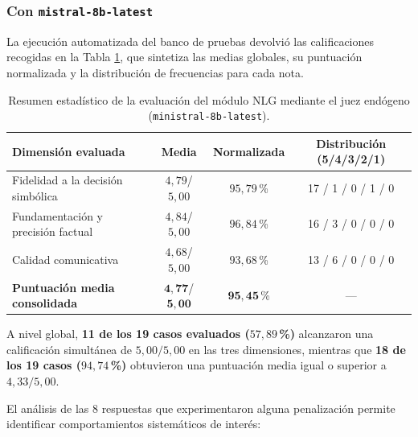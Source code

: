 \documentclass[12pt,a4paper]{report}
\begin{document}
\subsubsection{Con \texttt{mistral-8b-latest}}
La ejecución automatizada del banco de pruebas devolvió las calificaciones recogidas en la Tabla \ref{tab:nlg_summary}, que sintetiza las medias globales, su puntuación normalizada y la distribución de frecuencias para cada nota.

\begin{table}[H]
\centering
\footnotesize
\setlength{\tabcolsep}{4pt}
\label{tab:nlg_summary}
\begin{tabularx}{\textwidth}{@{}>{\raggedright\arraybackslash}X c c c@{}}
\toprule
\textbf{Dimensión evaluada} & \textbf{Media} & \textbf{Normalizada} & \textbf{Distribución (5/4/3/2/1)} \\
\midrule
Fidelidad a la decisión simbólica & $4{,}79$/$5{,}00$ & $95{,}79\,$\% & 17 / 1 / 0 / 1 / 0 \\
Fundamentación y precisión factual & $4{,}84$/$5{,}00$ & $96{,}84\,$\% & 16 / 3 / 0 / 0 / 0 \\
Calidad comunicativa & $4{,}68$/$5{,}00$ & $93{,}68\,$\% & 13 / 6 / 0 / 0 / 0 \\
\midrule
\textbf{Puntuación media consolidada} & $\mathbf{4{,}77}$/$\mathbf{5{,}00}$ & $\mathbf{95{,}45\,}$\% & --- \\
\end{tabularx}
\caption{Resumen estadístico de la evaluación del módulo NLG mediante el juez endógeno (\texttt{ministral-8b-latest}).}
\end{table}

A nivel global, \textbf{11 de los 19 casos evaluados ($57{,}89\,$\%)} alcanzaron una calificación simultánea de $5{,}00/5{,}00$ en las tres dimensiones, mientras que \textbf{18 de los 19 casos ($94{,}74\,$\%)} obtuvieron una puntuación media igual o superior a $4{,}33/5{,}00$.

El análisis de las 8 respuestas que experimentaron alguna penalización permite identificar comportamientos sistemáticos de interés:
\end{document}
